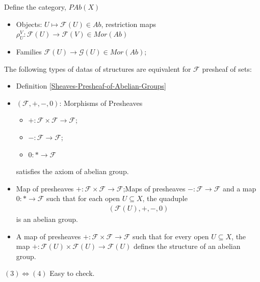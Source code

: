 \documentclass[Total.tex]{subfiles}
\begin{document}
				\begin{Def}
					\label{Sheaves-Presheaf-of-Abelian-Groups}Define the category, $PAb(X)$
					\begin{itemize}
						\item Objects: $U\mapsto \mathcal{F}(U)\in Ab$, restriction maps $\rho_U^V:\mathcal{F}(U)\rightarrow \mathcal{F}(V)\in Mor(Ab)$
						\item  Families $\mathcal{F}(U)\rightarrow \mathcal{G}(U)\in Mor(Ab)$;
					\end{itemize}
				\end{Def}
				
				\begin{proposition}
					The following types of datas of structures are equivalent for $\mathcal{F}$ presheaf of sets:
					
					\begin{itemize}
						\item Definition \ref{Sheaves-Presheaf-of-Abelian-Groups}
						\item $(\mathcal{F},+,-,0)$: Morphisms of Presheaves
						
						\begin{itemize}
							\item $+:\mathcal{F}\times \mathcal{F}\rightarrow \mathcal{F}$;
							\item $-:\mathcal{F}\rightarrow \mathcal{F}$;
							\item $0:*\rightarrow \mathcal{F}$
						\end{itemize}
						
						satisfies the axiom of abelian group.
						
						\item Map of presheaves $+:\mathcal{F}\times\mathcal{F}\rightarrow \mathcal{F}$;Maps of presheaves $-:\mathcal{F}\rightarrow \mathcal{F}$ and a map $0:*\rightarrow \mathcal{F}$ such that for each open $U\subseteq X$, the quaduple
						\begin{gather*}
							(\mathcal{F}(U),+,-,0)
						\end{gather*}
						is an abelian group.
						\item A map of presheaves $+:\mathcal{F}\times \mathcal{F}\rightarrow \mathcal{F}$ such that for every open $U\subseteq X$, the map $+:\mathcal{F}(U)\times \mathcal{F}(U)\rightarrow \mathcal{F}(U)$ defines the structure of an abelian group.
					\end{itemize}
					
					$(3)\Leftrightarrow (4)$ Easy to check.
				\end{proposition}
				
\end{document}
